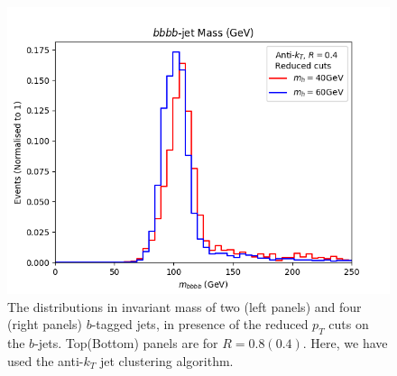 \documentclass[12pt]{article}
\begin{document}
\begin{figure}[htb!]
	\includegraphics[scale=0.5]{plots/bbbbmass_AK4_lowptcut.png}
	\caption{The distributions in invariant mass of two (left panels) and four (right panels) $b$-tagged jets, in presence of the
  reduced $p_T$ cuts on the $b$-jets.
Top(Bottom) panels are for $R = 0.8(0.4)$. Here, we have used the anti-$k_T$ jet clustering algorithm.}
\label{fig:invmass2}
\end{figure}
%



\end{document}
